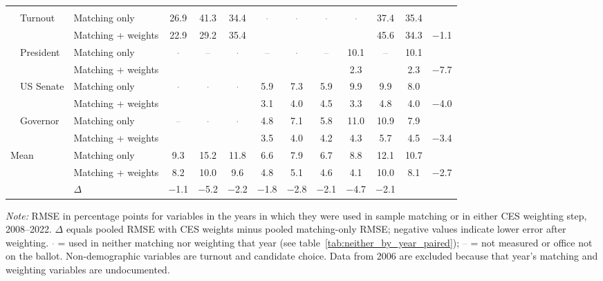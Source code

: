\begin{table}[!htbp]
{\begin{threeparttable}
\begin{tabular}{llcccccccccc}
\addlinespace[0.3em]
\multicolumn{12}{l}{Non-demographic} \\
\addlinespace[0.1em]
~~Turnout & Matching only & 26.9 & 41.3 & 34.4 & \textcolor{gray}{$\cdot$} & \textcolor{gray}{$\cdot$} & \textcolor{gray}{$\cdot$} & \textcolor{gray}{$\cdot$} & 37.4 & 35.4 & \\
 & Matching + weights & 22.9 & 29.2 & 35.4 &  &  &  &  & 45.6 & 34.3 & $-$1.1 \\
\addlinespace[0.1em]
~~President & Matching only & \textcolor{gray}{$\cdot$} & \textcolor{gray}{--} & \textcolor{gray}{$\cdot$} & \textcolor{gray}{--} & \textcolor{gray}{$\cdot$} & \textcolor{gray}{--} & 10.1 & \textcolor{gray}{--} & 10.1 & \\
 & Matching + weights &  &  &  &  &  &  & 2.3 &  & 2.3 & $-$7.7 \\
\addlinespace[0.1em]
~~US Senate & Matching only & \textcolor{gray}{$\cdot$} & \textcolor{gray}{$\cdot$} & \textcolor{gray}{$\cdot$} & 5.9 & 7.3 & 5.9 & 9.9 & 9.9 & 8.0 & \\
 & Matching + weights &  &  &  & 3.1 & 4.0 & 4.5 & 3.3 & 4.8 & 4.0 & $-$4.0 \\
\addlinespace[0.1em]
~~Governor & Matching only & \textcolor{gray}{--} & \textcolor{gray}{$\cdot$} & \textcolor{gray}{$\cdot$} & 4.8 & 7.1 & 5.8 & 11.0 & 10.9 & 7.9 & \\
 & Matching + weights &  &  &  & 3.5 & 4.0 & 4.2 & 4.3 & 5.7 & 4.5 & $-$3.4 \\
\midrule
Mean\tnote{b} & Matching only & 9.3 & 15.2 & 11.8 & 6.6 & 7.9 & 6.7 & 8.8 & 12.1 & 10.7 & \\
 & Matching + weights & 8.2 & 10.0 & 9.6 & 4.8 & 5.1 & 4.6 & 4.1 & 10.0 & 8.1 & $-$2.7 \\
 & $\Delta$ & $-$1.1 & $-$5.2 & $-$2.2 & $-$1.8 & $-$2.8 & $-$2.1 & $-$4.7 & $-$2.1 & & \\
\bottomrule
\end{tabular}
\begin{tablenotes}
\footnotesize
\item \textit{Note:} RMSE in percentage points for variables in the years in which they were used in sample matching or in either CES weighting step, 2008--2022. $\Delta$ equals pooled RMSE with CES weights minus pooled matching-only RMSE; negative values indicate lower error after weighting. \textcolor{gray}{$\cdot$} = used in neither matching nor weighting that year (see table~\ref{tab:neither_by_year_paired}); \textcolor{gray}{--} = not measured or office not on the ballot. Non-demographic variables are turnout and candidate choice. Data from 2006 are excluded because that year's matching and weighting variables are undocumented.

\end{tablenotes}
\end{threeparttable}}
\end{table}
